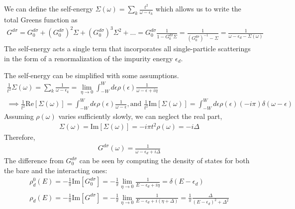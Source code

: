 We can define the self-energy \(\Sigma(\omega) = \sum_k\frac{t^2}{\omega - \epsilon_k}\) which allows us to write the total Greens function as
\begin{equation}\begin{aligned}
	G^{d\sigma} = G^{d\sigma}_0 + \left(G^{d\sigma}_0\right)^2 \Sigma + \left(G^{d\sigma}_0\right)^3 \Sigma^2 + \ldots = G^{d\sigma}_0 \frac{1}{1 - G^{d\sigma}_0 \Sigma} = \frac{1}{\left(G^{d\sigma}_0\right)^{-1} - \Sigma} = \frac{1}{\omega- \epsilon_d - \Sigma(\omega)}
\end{aligned}\end{equation}
The self-energy acts a single term that incorporates all single-particle scatterings in the form of a renormalization of the impurity energy \(\epsilon_d\).

The self-energy can be simplified with some assumptions.
\begin{gather}
\frac{1}{t^2}\Sigma(\omega) = \sum_k \frac{1}{\omega - \epsilon_k} = \lim_{\eta \rightarrow 0}\int_{-W}^W d\epsilon \rho(\epsilon) \frac{1}{\omega - \epsilon + i\eta}\\
\implies \frac{1}{t^2}\text{Re} \left[\Sigma(\omega)\right] = \int_{-W}^W d\epsilon \rho(\epsilon)\frac{1}{\omega - \epsilon}, \text{and }\frac{1}{t^2}\text{Im} \left[\Sigma(\omega)\right] = \int_{-W}^W d\epsilon \rho(\epsilon) (-i\pi)\delta(\omega-\epsilon)
\end{gather}
Assuming \(\rho(\omega)\) varies sufficiently slowly, we can neglect the real part,
\begin{equation}\begin{aligned}
	\Sigma(\omega) = \text{Im}\left[\Sigma(\omega)\right] = -i\pi t^2 \rho(\omega) = -i\Delta
\end{aligned}\end{equation}
Therefore,
\begin{equation}\begin{aligned}
	G^{d\sigma}(\omega) = \frac{1}{\omega-\epsilon_d+i\Delta}
\end{aligned}\end{equation}
The difference from \(G^{d\sigma}_0\) can be seen by computing the density of states for both the bare and the interacting ones:
\begin{gather}
	\rho_d^0(E) = -\frac{1}{\pi}\text{Im}\left[G_0^{d\sigma}\right] = -\frac{1}{\pi} \lim_{\eta \rightarrow 0} \frac{1}{E - \epsilon_d + i\eta} = \delta(E - \epsilon_d)\\
	\rho_d(E) = -\frac{1}{\pi}\text{Im}\left[G^{d\sigma}\right]= -\frac{1}{\pi} \lim_{\eta \rightarrow 0} \frac{1}{E - \epsilon_d + i(\eta+\Delta)} = \frac{1}{\pi}\frac{\Delta}{(E-\epsilon_d)^2 + \Delta^2}\label{densitys}
\end{gather}
